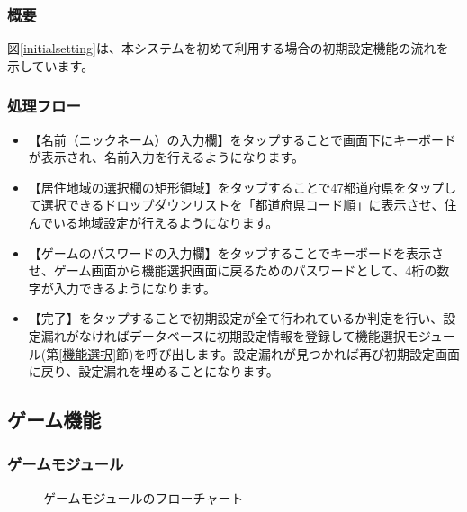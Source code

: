 \documentclass[a4j]{jarticle}
\begin{document}
\subsubsection*{概要}
図\ref{initialsetting}は、本システムを初めて利用する場合の初期設定機能の流れを示しています。


\subsubsection*{処理フロー}
\begin{itemize}
\item 【名前（ニックネーム）の入力欄】をタップすることで画面下にキーボードが表示され、名前入力を行えるようになります。

\item 【居住地域の選択欄の矩形領域】をタップすることで47都道府県をタップして選択できるドロップダウンリストを「都道府県コード順」に表示させ、住んでいる地域設定が行えるようになります。

\item 【ゲームのパスワードの入力欄】をタップすることでキーボードを表示させ、ゲーム画面から機能選択画面に戻るためのパスワードとして、4桁の数字が入力できるようになります。

\item 【完了】をタップすることで初期設定が全て行われているか判定を行い、設定漏れがなければデータベースに初期設定情報を登録して機能選択モジュール(第\ref{機能選択}節)を呼び出します。設定漏れが見つかれば再び初期設定画面に戻り、設定漏れを埋めることになります。
\end{itemize}

\newpage


\subsection{ゲーム機能}
\subsubsection{ゲームモジュール\label{ゲーム}}
\begin{figure}[H]
    \begin{center}
    \caption {ゲームモジュールのフローチャート}
    \label{game}
    \end{center}
\end{figure}
\end{document}

